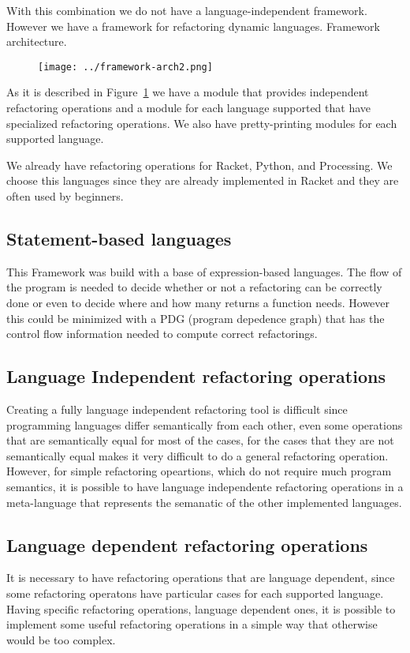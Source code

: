 With this combination we do not have a language-independent framework. However we have a framework
for refactoring dynamic languages.
Framework architecture.%
\begin{figure}[h]
\texttt{[image: ../framework-arch2.png]}
\label{fig:framework}
\end{figure}

As it is described in Figure~\ref{fig:framework} we have a module that provides
independent refactoring operations and a module for each language supported that
have specialized refactoring operations. We also have pretty-printing modules for
each supported language.

We already have refactoring operations for Racket, Python, and Processing. We choose
this languages since they are already implemented in Racket and they are often used by beginners.


\subsection{Statement-based languages}
This Framework was build with a base of expression-based languages. The flow of
the program is needed to decide whether or not a refactoring can be correctly done
or even to decide where and how many returns a function needs. However this could
be minimized with a PDG (program depedence graph) that has the control flow information
needed to compute correct refactorings.

\subsection{Language Independent refactoring operations}
Creating a fully language independent refactoring tool is difficult since programming
languages differ semantically from each other, even some operations that are semantically
equal for most of the cases, for the cases that they are not semantically equal makes it very
difficult to do a general refactoring operation.
However, for simple refactoring opeartions, which do not require much program semantics,
it is possible to have language independente refactoring operations in a meta-language that
represents the semanatic of the other implemented languages. %

\subsection{Language dependent refactoring operations}
It is necessary to have refactoring operations that are language dependent, since
some refactoring operatons have particular cases for each supported language.
Having specific refactoring operations, language dependent ones, it is possible
to implement some useful refactoring operations in a simple way that otherwise would
be too complex.

